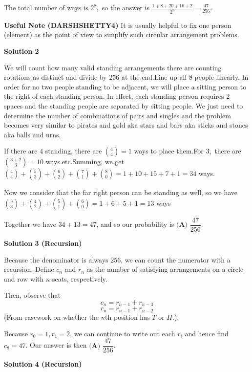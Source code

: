 \begin{enumerate}
 The total number of ways is $2^8,$ so the answer is $\frac{1 + 8 + 20 + 16 + 2}{2^8} = \boxed{\frac{47}{256}}.$

 \textbf{Useful Note (DARSHSHETTY4)} It is usually helpful to fix one person (element) as the point of view to simplify such circular arrangement problems.

 



\textbf{Solution 2}

We will count how many valid standing arrangements there are counting rotations as distinct and divide by $256$ at the end.Line up all $8$ people linearly.  In order for no two people standing to be adjacent, we will place a sitting person to the right of each standing person.  In effect, each standing person requires $2$ spaces and the standing people are separated by sitting people.  We just need to determine the number of combinations of pairs and singles and the problem becomes very similar to pirates and gold aka stars and bars aka sticks and stones aka balls and urns.

 If there are $4$ standing, there are ${4 \choose 4}=1$ ways to place them.For $3,$ there are ${3+2 \choose 3}=10$ ways.etc.Summing, we get ${4 \choose 4}+{5 \choose 3}+{6 \choose 2}+{7 \choose 1}+{8 \choose 0}=1+10+15+7+1=34$ ways.

 Now we consider that the far right person can be standing as well, so we have${3 \choose 3}+{4 \choose 2}+{5 \choose 1}+{6 \choose 0}=1+6+5+1=13$ ways

 Together we have $34+13=47$, and so our probability is $\boxed{\textbf{(A) } \dfrac{47}{256}}$.

 



\textbf{Solution 3 (Recursion)}

Because the denominator is always $256$, we can count the numerator with a recursion. Define $c_n$ and $r_n$ as the number of satisfying arrangements on a circle and row with $n$ seats, respectively. 

 Then, observe that 
 \[c_n=r_{n-1}+r_{n-3}\] 
 \[r_n=r_{n-1}+r_{n-2}\](From casework on whether the $n$th position has $T$ or $H$.). 

 Because $r_0=1, r_1=2$, we can continue to write out each $r_i$ and hence find $c_8=47$. Our answer is then $\boxed{\textbf{(A) } \dfrac{47}{256}}$.

 



\textbf{Solution 4 (Recursion)}


\end{enumerate}
